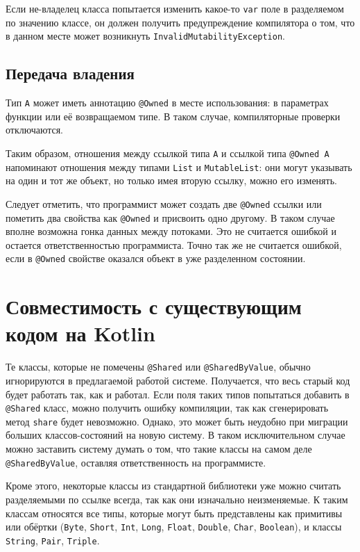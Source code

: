 \documentclass[specification,annotation,times]{itmo-student-thesis}
\begin{document}
Если не-владелец класса попытается изменить какое-то \texttt{var} поле в разделяемом по значению классе, он должен получить предупреждение компилятора о том, что в данном месте может возникнуть \texttt{InvalidMutabilityException}.

\subsection{Передача владения}

Тип \texttt{А} может иметь аннотацию \texttt{@Owned} в месте использования: в параметрах функции или её возвращаемом типе. В таком случае, компиляторные проверки отключаются.

Таким образом, отношения между ссылкой типа \texttt{А} и ссылкой типа \texttt{@Owned A} напоминают отношения между типами \texttt{List} и \texttt{MutableList}: они могут указывать на один и тот же объект, но только имея вторую ссылку, можно его изменять.

Следует отметить, что программист может создать две \texttt{@Owned} ссылки или пометить два свойства как \texttt{@Owned} и присвоить одно другому. В таком случае вполне возможна гонка данных между потоками. Это не считается ошибкой и остается ответственностью программиста.
Точно так же не считается ошибкой, если в \texttt{@Owned} свойстве оказался объект в уже разделенном состоянии.

\section{Совместимость с существующим кодом на Kotlin}\label{backwards_compat}

Те классы, которые не помечены \texttt{@Shared} или \texttt{@SharedByValue}, обычно игнорируются в предлагаемой работой системе.
Получается, что весь старый код будет работать так, как и работал.
Если поля таких типов попытаться добавить в \texttt{@Shared} класс, можно получить ошибку компиляции, так как сгенерировать метод \texttt{share} будет невозможно.
Однако, это может быть неудобно при миграции больших классов-состояний на новую систему.
В таком исключительном случае можно заставить систему думать о том, что такие классы на самом деле \texttt{@SharedByValue}, оставляя ответственность на программисте.

Кроме этого, некоторые классы из стандартной библиотеки уже можно считать разделяемыми по ссылке всегда, так как они изначально неизменяемые.
К таким классам относятся все типы, которые могут быть представлены как примитивы или обёртки (\texttt{Byte}, \texttt{Short}, \texttt{Int}, \texttt{Long}, \texttt{Float}, \texttt{Double}, \texttt{Char}, \texttt{Boolean}), и классы \texttt{String}, \texttt{Pair}, \texttt{Triple}.
\chapterconclusion
\end{document}
